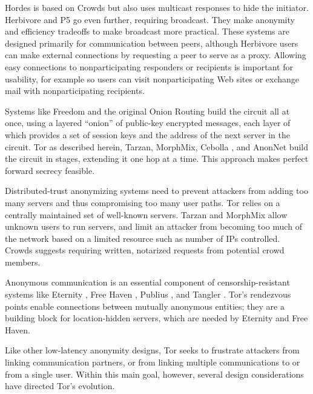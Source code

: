 \documentclass[times,10pt,twocolumn]{article}
\begin{document}
Hordes \cite{hordes-jcs} is based on Crowds but also uses multicast
responses to hide the initiator. Herbivore \cite{herbivore} and P5
\cite{p5} go even further, requiring broadcast. They make anonymity
and efficiency tradeoffs to make broadcast more practical.
These systems are designed primarily for communication between peers,
although Herbivore users can make external connections by
requesting a peer to serve as a proxy.  Allowing easy connections to
nonparticipating responders or recipients is important for usability,
for example so users can visit nonparticipating Web sites or exchange
mail with nonparticipating recipients.

Systems like Freedom and the original Onion Routing build the circuit
all at once, using a layered ``onion'' of public-key encrypted messages,
each layer of which provides a set of session keys and the address of the
next server in the circuit. Tor as described herein, Tarzan, MorphMix,
Cebolla \cite{cebolla}, and AnonNet \cite{anonnet} build the circuit
in stages, extending it one hop at a time. This approach makes perfect
forward secrecy feasible.

Distributed-trust anonymizing systems need to prevent attackers from
adding too many servers and thus compromising too many user paths.
Tor relies on a centrally maintained set of well-known servers. Tarzan
and MorphMix allow unknown users to run servers, and limit an attacker
from becoming too much of the network based on a limited resource such
as number of IPs controlled. Crowds suggests requiring written, notarized
requests from potential crowd members.

Anonymous communication is an essential component of censorship-resistant
systems like Eternity \cite{eternity}, Free Haven \cite{freehaven-berk},
Publius \cite{publius}, and Tangler \cite{tangler}. Tor's rendezvous
points enable connections between mutually anonymous entities; they
are a building block for location-hidden servers, which are needed by
Eternity and Free Haven.


\label{sec:assumptions}

Like other low-latency anonymity designs, Tor seeks to frustrate
attackers from linking communication partners, or from linking
multiple communications to or from a single user.  Within this
main goal, however, several design considerations have directed
Tor's evolution.
\end{document}
